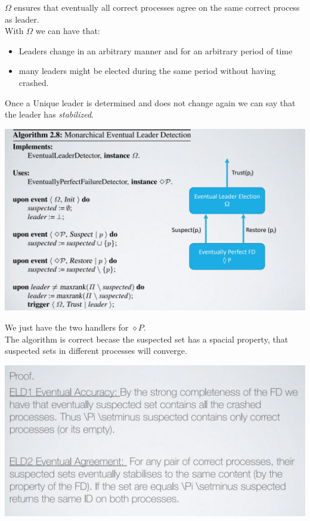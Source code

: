 \documentclass[11pt, a4paper]{article}
\begin{document}
$\Omega$ ensures that eventually all correct processes agree on the same correct process as leader.\\
With $\Omega$ we can have that:
\begin{itemize}
    \item Leaders change in an arbitrary manner and for an arbitrary period of time
    \item many leaders might be elected during the same period without having crashed.
\end{itemize}
Once a Unique leader is determined and does not change again we can say that the leader has \textit{stabilized}.\\
\begin{center}
    \includegraphics[scale=0.5]{img/LE/ele-algo.png}
\end{center}
We just have the two handlers for $\diamond P$.\\
The algorithm is correct becase the suspected set has a spacial property, that suspected sets in different processes will converge.
\begin{center}
    \includegraphics[scale=0.5]{img/LE/ele-proof.png}
\end{center}
\end{document}
